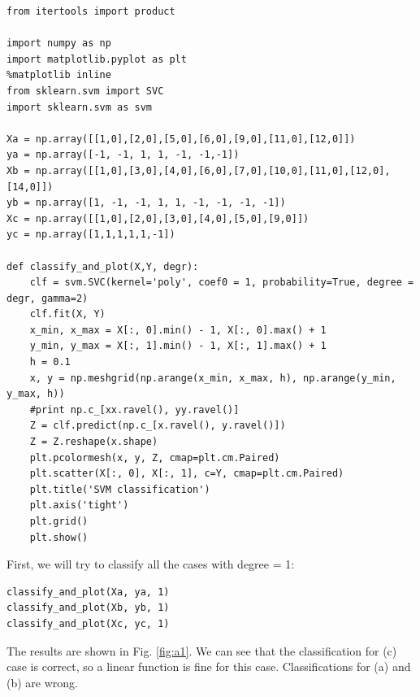 \documentclass[a4paper, 12pt]{article}
\begin{document}
\lstset{language=Python}
\begin{lstlisting}[frame=single]
from itertools import product

import numpy as np
import matplotlib.pyplot as plt
%matplotlib inline
from sklearn.svm import SVC
import sklearn.svm as svm

Xa = np.array([[1,0],[2,0],[5,0],[6,0],[9,0],[11,0],[12,0]])
ya = np.array([-1, -1, 1, 1, -1, -1,-1])
Xb = np.array([[1,0],[3,0],[4,0],[6,0],[7,0],[10,0],[11,0],[12,0],[14,0]])
yb = np.array([1, -1, -1, 1, 1, -1, -1, -1, -1])
Xc = np.array([[1,0],[2,0],[3,0],[4,0],[5,0],[9,0]]) 
yc = np.array([1,1,1,1,1,-1])

def classify_and_plot(X,Y, degr):
    clf = svm.SVC(kernel='poly', coef0 = 1, probability=True, degree = degr, gamma=2)
    clf.fit(X, Y)
    x_min, x_max = X[:, 0].min() - 1, X[:, 0].max() + 1
    y_min, y_max = X[:, 1].min() - 1, X[:, 1].max() + 1
    h = 0.1
    x, y = np.meshgrid(np.arange(x_min, x_max, h), np.arange(y_min, y_max, h))
    #print np.c_[xx.ravel(), yy.ravel()]
    Z = clf.predict(np.c_[x.ravel(), y.ravel()])
    Z = Z.reshape(x.shape)
    plt.pcolormesh(x, y, Z, cmap=plt.cm.Paired)
    plt.scatter(X[:, 0], X[:, 1], c=Y, cmap=plt.cm.Paired)
    plt.title('SVM classification')
    plt.axis('tight')
    plt.grid()
    plt.show()
\end{lstlisting}

First, we will try to classify all the cases with degree = 1:

\lstset{language=Python}
\begin{lstlisting}[frame=single]
classify_and_plot(Xa, ya, 1)
classify_and_plot(Xb, yb, 1)
classify_and_plot(Xc, yc, 1)
\end{lstlisting}

The results are shown in Fig. \ref{fig:a1}. We can see that the classification for (c) case is correct, so a linear function is fine for this case. Classifications for (a) and (b) are wrong.\\
\end{document}
